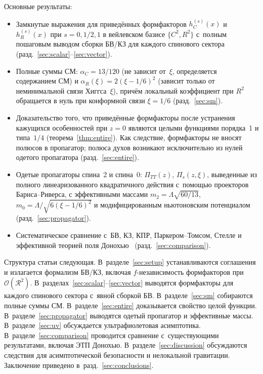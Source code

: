 \documentclass[aps,prd,twocolumn,superscriptaddress,nofootinbib,floatfix]{revtex4-2}
\theoremstyle{definition}
\theoremstyle{remark}
\begin{document}
Основные результаты:
\begin{itemize}
\item Замкнутые выражения для приведённых формфакторов
  $h_C^{(s)}(x)$ и $h_R^{(s)}(x)$ при $s = 0, 1/2, 1$ в вейлевском базисе
  $\{C^2, R^2\}$ с~полным пошаговым выводом сборки БВ/КЗ для каждого
  спинового сектора (разд.~\ref{sec:scalar}--\ref{sec:vector}).
\item Полные суммы СМ: $\alpha_C = 13/120$ (не зависит от~$\xi$,
  определяется содержанием СМ) и $\alpha_R(\xi) = 2(\xi - 1/6)^2$
  (зависит только от неминимальной связи Хиггса~$\xi$), причём
  локальный коэффициент при $R^2$ обращается в нуль при конформной
  связи $\xi = 1/6$ (разд.~\ref{sec:sm}).
\item Доказательство того, что приведённые формфакторы после
  устранения кажущихся особенностей при $z = 0$ являются целыми
  функциями порядка~1 и типа~$1/4$ (теорема~\ref{thm:entire}).
  Как следствие, формфакторы не вносят полюсов в пропагатор; полюса
  духов возникают исключительно из нулей одетого пропагатора
  (разд.~\ref{sec:entire}).
\item Одетые пропагаторы спина~2 и спина~0:
  $\Pi_{TT}(z)$, $\Pi_s(z,\xi)$, выведенные из полного линеаризованного
  квадратичного действия с~помощью проекторов Барнса--Риверса, с
  эффективными массами $m_2 = \Lambda\sqrt{60/13}$,
  $m_0 = \Lambda/\sqrt{6(\xi - 1/6)^2}$ и модифицированным ньютоновским
  потенциалом (разд.~\ref{sec:propagator}).
\item Систематическое сравнение с~БВ, КЗ, КПР, Паркером--Томсом,
  Стелле и эффективной теорией поля
  Донохью~\cite{Donoghue:1994dn,BjerrumBohr:2002kt}
  (разд.~\ref{sec:comparison}).
\end{itemize}

Структура статьи следующая. В~разделе~\ref{sec:setup} устанавливаются
соглашения и излагается формализм БВ/КЗ, включая $f$-независимость
формфакторов при $\mathcal{O}(\mathcal{R}^2)$.
В~разделах~\ref{sec:scalar}--\ref{sec:vector} выводятся формфакторы для
каждого спинового сектора с~явной сборкой БВ.
В~разделе~\ref{sec:sm} собираются полные суммы СМ.
В~разделе~\ref{sec:entire} доказывается свойство целой функции.
В~разделе~\ref{sec:propagator} выводятся одетый пропагатор и эффективные
массы. В~разделе~\ref{sec:uv} обсуждается ультрафиолетовая асимптотика.
В~разделе~\ref{sec:comparison} проводится сравнение с~существующими
результатами, включая ЭТП Донохью. В~разделе~\ref{sec:discussion}
обсуждаются следствия для асимптотической безопасности и нелокальной
гравитации. Заключение приведено в~разд.~\ref{sec:conclusions}.
\end{document}
